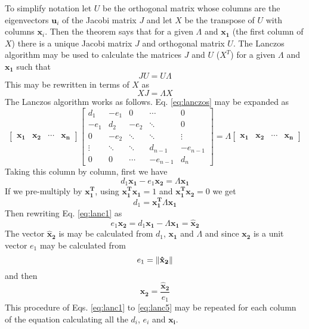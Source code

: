 \documentclass{mbd_fullpaper}
\begin{document}
To simplify notation let $U$ be the orthogonal matrix whose columns are the eigenvectors $\mathbf{u}_i$ of the Jacobi matrix $J$ and let $X$ be the transpose of $U$ with columns $\mathbf{x}_i$.
Then the theorem says that for a given $\Lambda$ and $\mathbf{x_1}$ (the first column of $X$) there is a unique Jacobi matrix $J$ and orthogonal matrix $U$.
The Lanczos algorithm may be used to calculate the matrices $J$ and $U$ ($X^T$) for a given $\Lambda$ and $\mathbf{x_1}$ such that 
\begin{equation}
J U = U \Lambda
\end{equation}
This may be rewritten in terms of $X$ as
\begin{equation}
X J = \Lambda X
\label{eq:lanczos}
\end{equation}
The Lanczos algorithm works as follows.
Eq. \ref{eq:lanczos} may be expanded as
\begin{equation}
\begin{bmatrix} \mathbf{x_1} &  \mathbf{x_2} & \cdots & \mathbf{x_n} \end{bmatrix}
\begin{bmatrix} d_1  &  -e_1 & 0 & \cdots & 0 \\
-e_1 & d_2  & -e_2 & \ddots & 0 \\
0 & -e_2 & \ddots & \ddots & \vdots \\
\vdots & \ddots & \ddots & d_{n-1} & -e_{n-1} \\
0 & 0 & \cdots & -e_{n-1} & d_n \end{bmatrix}
=
\Lambda
\begin{bmatrix} \mathbf{x_1} &  \mathbf{x_2} & \cdots & \mathbf{x_n} \end{bmatrix}
\end{equation}
Taking this column by column, first we have
\begin{equation}
d_1 \mathbf{x_1} - e_1 \mathbf{x_2} = \Lambda \mathbf{x_1}
\label{eq:lanc1}
\end{equation}
If we pre-multiply by $\mathbf{x_1^T}$, using $\mathbf{x_1^T} \mathbf{x_1}=1$ and $\mathbf{x_1^T} \mathbf{x_2}=0$ we get
\begin{equation}
d_1 = \mathbf{x_1^T} \Lambda \mathbf{x_1}
\label{eq:lanc2} 
\end{equation}
Then rewriting Eq. \ref{eq:lanc1} as
\begin{equation}
e_1 \mathbf{x_2} = d_1 \mathbf{x_1} - \Lambda \mathbf{x_1} = \mathbf{\hat{x}_2}
\label{eq:lanc3}
\end{equation}
The vector $\mathbf{\hat{x}_2}$ is may be calculated from $d_1$, $\mathbf{x_1}$ and $\Lambda$ and since $\mathbf{x_2}$ is a unit vector $e_1$ may be calculated from
\begin{equation}
e_1 = \left\lVert\mathbf{\hat{x}_2}\right\rVert
\label{eq:lanc4}
\end{equation}
and then
\begin{equation}
\mathbf{x_2} = \frac{\mathbf{\hat{x}_2}}{e_1}
\label{eq:lanc5}
\end{equation}
This procedure of Eqs. \ref{eq:lanc1} to \ref{eq:lanc5} may be repeated for each column of the equation calculating all the $d_i$, $e_i$ and $\mathbf{x_i}$.
\end{document}
